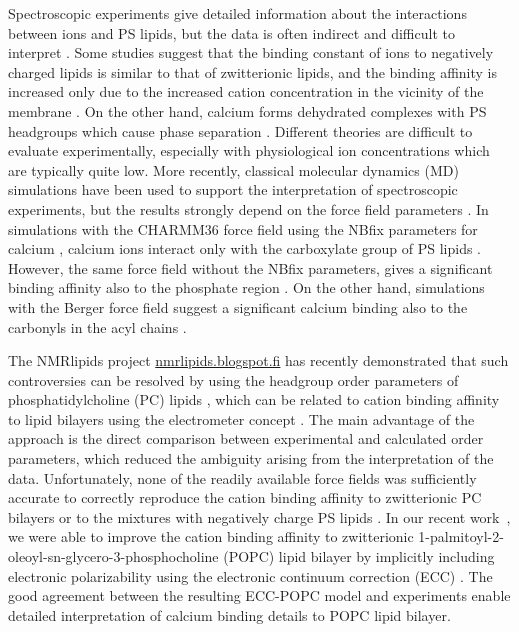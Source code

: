 \documentclass[journal=jpcbfk,manuscript=article]{achemso}
\begin{document}
Spectroscopic experiments give detailed information about the
interactions between ions and PS lipids, but the data is often indirect and difficult to
interpret \cite{hauser77,kurland79,eisenberg79,hauser83,dluhy83,hauser85,feigenson86,mattai89,roux90,roux91}.
Some studies suggest that the
binding constant of ions to negatively charged lipids is similar to that of zwitterionic lipids,
and the binding affinity is increased only due to the increased cation
concentration in the vicinity of the membrane \cite{seelig90,sinn06}.
On the other hand, calcium forms dehydrated complexes with PS headgroups
which cause phase separation \cite{hauser77,kurland79,hauser85,feigenson86,mattai89,roux90,roux91,boettcher11}.
Different theories are difficult to evaluate experimentally,
especially with physiological ion concentrations which are typically quite low.
More recently, classical molecular dynamics (MD) simulations
have been used to support the interpretation of spectroscopic experiments,
but the results strongly depend on the force field parameters \cite{boettcher11,kucerka14,melcrova16,hallock18,valentine18}.
In simulations with the CHARMM36 force field \cite{klauda10,venable13} using the NBfix parameters for calcium \cite{kim16}, 
calcium ions interact only with the carboxylate group of PS lipids \cite{valentine18}.
However, the same force field without the NBfix parameters, gives a significant binding affinity also to the phosphate region \cite{hallock18}.
On the other hand, simulations with the Berger force field \cite{berger97,mukhopadhyay04}
suggest a significant calcium binding also to the carbonyls in the acyl chains \cite{melcrova16}.

The NMRlipids project \url{nmrlipids.blogspot.fi} has recently demonstrated
that such controversies can be resolved by using the headgroup order parameters
of phosphatidylcholine (PC) lipids \cite{catte16, NMRlipidsIV}, which can
be related to cation binding affinity to lipid bilayers using the electrometer
concept \cite{akutsu81,altenbach84,seelig87}. The main advantage of the approach
is the direct comparison between experimental and calculated order parameters,
which reduced the ambiguity arising from the interpretation of the data.
Unfortunately, none of the readily available force fields was sufficiently accurate to correctly reproduce the
cation binding affinity to zwitterionic PC bilayers \cite{catte16} or to the
mixtures with negatively charge PS lipids \cite{NMRlipidsIV}.
In our recent work~\cite{melcr18}, we were able to improve the cation binding affinity
to zwitterionic 1-palmitoyl-2-oleoyl-sn-glycero-3-phosphocholine (POPC) lipid bilayer
by implicitly including electronic polarizability using the electronic continuum
correction (ECC) \cite{leontyev09}. The good agreement between the resulting ECC-POPC
model and experiments enable detailed interpretation of calcium binding details to POPC lipid bilayer.
\end{document}
